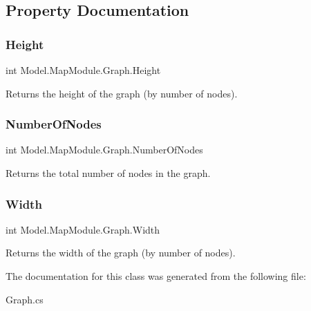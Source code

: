 \subsection{Property Documentation}
\hypertarget{class_model_1_1_map_module_1_1_graph_ae86adb2a7093762d93b02f7768194ee5}{}\label{class_model_1_1_map_module_1_1_graph_ae86adb2a7093762d93b02f7768194ee5} 
\subsubsection{\texorpdfstring{Height}{Height}}
{\footnotesize\ttfamily int Model.\+Map\+Module.\+Graph.\+Height\hspace{0.3cm}{\ttfamily [get]}}

Returns the height of the graph (by number of nodes). \hypertarget{class_model_1_1_map_module_1_1_graph_a949cc2946985a51788e917d1a697d6e9}{}\label{class_model_1_1_map_module_1_1_graph_a949cc2946985a51788e917d1a697d6e9} 
\subsubsection{\texorpdfstring{Number\+Of\+Nodes}{NumberOfNodes}}
{\footnotesize\ttfamily int Model.\+Map\+Module.\+Graph.\+Number\+Of\+Nodes\hspace{0.3cm}{\ttfamily [get]}}

Returns the total number of nodes in the graph. \hypertarget{class_model_1_1_map_module_1_1_graph_a62c540735318014678e4adb153ee8c2e}{}\label{class_model_1_1_map_module_1_1_graph_a62c540735318014678e4adb153ee8c2e} 
\subsubsection{\texorpdfstring{Width}{Width}}
{\footnotesize\ttfamily int Model.\+Map\+Module.\+Graph.\+Width\hspace{0.3cm}{\ttfamily [get]}}

Returns the width of the graph (by number of nodes). 

The documentation for this class was generated from the following file\+:\begin{DoxyCompactItemize}
\item 
Graph.\+cs\end{DoxyCompactItemize}

